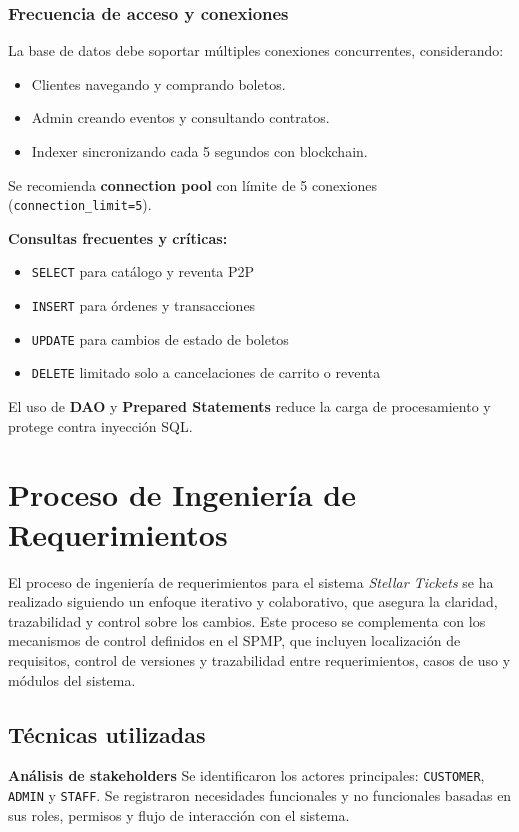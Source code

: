 \documentclass[12pt,letterpaper]{article}
\begin{document}
\subsubsection{Frecuencia de acceso y conexiones}
La base de datos debe soportar múltiples conexiones concurrentes, considerando:

\begin{itemize}
    \item Clientes navegando y comprando boletos.
    \item Admin creando eventos y consultando contratos.
    \item Indexer sincronizando cada 5 segundos con blockchain.
\end{itemize}

Se recomienda \textbf{connection pool} con límite de 5 conexiones (\texttt{connection\_limit=5}).

\textbf{Consultas frecuentes y críticas:}
\begin{itemize}
    \item \texttt{SELECT} para catálogo y reventa P2P
    \item \texttt{INSERT} para órdenes y transacciones
    \item \texttt{UPDATE} para cambios de estado de boletos
    \item \texttt{DELETE} limitado solo a cancelaciones de carrito o reventa
\end{itemize}
El uso de \textbf{DAO} y \textbf{Prepared Statements} reduce la carga de procesamiento y protege contra inyección SQL.

\section{Proceso de Ingeniería de Requerimientos}

El proceso de ingeniería de requerimientos para el sistema \textit{Stellar Tickets}
se ha realizado siguiendo un enfoque iterativo y colaborativo, que asegura la
claridad, trazabilidad y control sobre los cambios. Este proceso se complementa
con los mecanismos de control definidos en el SPMP, que incluyen localización de
requisitos, control de versiones y trazabilidad entre requerimientos, casos de
uso y módulos del sistema.

\subsection{Técnicas utilizadas}

\textbf{Análisis de stakeholders}  
Se identificaron los actores principales: \texttt{CUSTOMER}, \texttt{ADMIN} y
\texttt{STAFF}. Se registraron necesidades funcionales y no funcionales basadas
en sus roles, permisos y flujo de interacción con el sistema.
\end{document}
